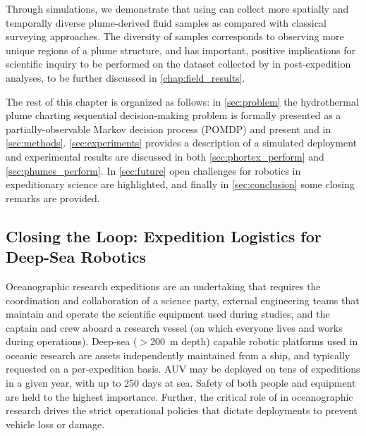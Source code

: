 Through simulations, we demonstrate that \Sentry using \PHORTEX can collect more spatially and temporally diverse plume-derived fluid samples as compared with classical surveying approaches. The diversity of samples corresponds to observing more unique regions of a plume structure, and has important, positive implications for scientific inquiry to be performed on the dataset collected by \Sentry in post-expedition analyses, to be further discussed in \cref{chap:field_results}. 

The rest of this chapter is organized as follows: in \cref{sec:problem} the hydrothermal plume charting sequential decision-making problem is formally presented as a partially-observable Markov decision process (POMDP) and present \PHORTEX and \PHUMES in \cref{sec:methods}. \cref{sec:experiments} provides a description of a simulated deployment and experimental results are discussed in both \cref{sec:phortex_perform} and \cref{sec:phumes_perform}. In \cref{sec:future} open challenges for robotics in expeditionary science are highlighted, and finally in \cref{sec:conclusion} some closing remarks are provided. 

\subsection{Closing the Loop: Expedition Logistics for Deep-Sea Robotics}
Oceanographic research expeditions are an undertaking that requires the coordination and collaboration of a science party, external engineering teams that maintain and operate the scientific equipment used during studies, and the captain and crew aboard a research vessel (on which everyone lives and works during operations). Deep-sea ($>$\SI{200}{\meter} depth) capable robotic platforms used in oceanic research are assets independently maintained from a ship, and typically requested on a per-expedition basis. AUV \Sentry may be deployed on tens of expeditions in a given year, with up to 250 days at sea\autocite{kaiser2016design}. Safety of both people and equipment are held to the highest importance. Further, the critical role of \Sentry in oceanographic research drives the strict operational policies that dictate \Sentry deployments to prevent vehicle loss or damage.

